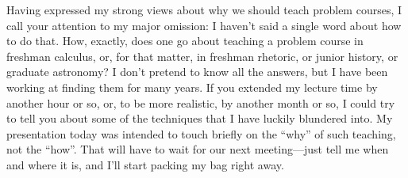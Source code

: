 \documentclass[a4paper,12pt]{article}
\begin{document}
Having expressed my strong views about why we should teach problem courses,
I call your attention to my major omission: I haven’t said a single word about how
to do that.  How, exactly, does one go about teaching a problem course in freshman
calculus, or, for that matter, in freshman rhetoric, or junior history, or graduate
astronomy?  I don’t pretend to know all the answers, but I have been working at
finding them for many years.  If you extended my lecture time by another hour or
so, or, to be more realistic, by another month or so, I could try to tell you about
some of the techniques that I have luckily blundered into.  My presentation today
was intended to touch briefly on the “why” of such teaching, not the “how”.  That
will have to wait for our next meeting—just tell me when and where it is, and I’ll
start packing my bag right away.
\end{document}
